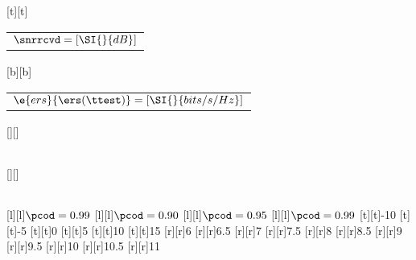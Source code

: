 %    
%
%
%
[t][t]{\fontsize{8}{12}\selectfont \color[rgb]{0,0,0}\setlength{\tabcolsep}{0pt}\begin{tabular}{c}$\snrrcvd = [\SI{}{dB}]$\end{tabular}}%
[b][b]{\fontsize{8}{12}\selectfont \color[rgb]{0,0,0}\setlength{\tabcolsep}{0pt}\begin{tabular}{c}$\e{ers}{\ers(\ttest)} = [\SI{}{bits/s/Hz}]$\end{tabular}}%
[][]{\fontsize{10}{15}\selectfont \color[rgb]{0,0,0}\setlength{\tabcolsep}{0pt}\begin{tabular}{c} \end{tabular}}%
[][]{\fontsize{10}{15}\selectfont \color[rgb]{0,0,0}\setlength{\tabcolsep}{0pt}\begin{tabular}{c} \end{tabular}}%
[l][l]{\fontsize{8}{12}\selectfont \color[rgb]{0,0,0}$\pcod = 0.99$}%
[l][l]{\fontsize{8}{12}\selectfont \color[rgb]{0,0,0}$\pcod = 0.90$}%
[l][l]{\fontsize{8}{12}\selectfont \color[rgb]{0,0,0}$\pcod = 0.95$}%
[l][l]{\fontsize{8}{12}\selectfont \color[rgb]{0,0,0}$\pcod = 0.99$}%
%
\fontsize{8}{12}%
\selectfont%
%
[t][t]{-10}%
[t][t]{-5}%
[t][t]{0}%
[t][t]{5}%
[t][t]{10}%
[t][t]{15}%
%
[r][r]{6}%
[r][r]{6.5}%
[r][r]{7}%
[r][r]{7.5}%
[r][r]{8}%
[r][r]{8.5}%
[r][r]{9}%
[r][r]{9.5}%
[r][r]{10}%
[r][r]{10.5}%
[r][r]{11}%
%
%
